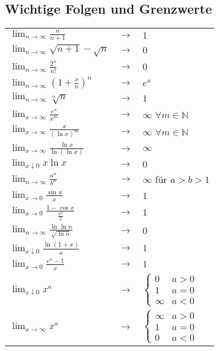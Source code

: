 \documentclass[a4paper,9pt]{extarticle}
\newcommand{\liminfty}[1][n]{\lim_{#1 \to \infty}}
\begin{document}
	\subsection*{Wichtige Folgen und Grenzwerte}
	\begin{tabular}{lcl}
		$ \liminfty{\frac{n}{n + 1}} $ & $\to$ & $1$ \\ [1ex]
		$ \liminfty{\sqrt{n + 1} - \sqrt{n}} $ & $\to$ & $0$ \\ [1ex]
		$ \liminfty{\frac{2^n}{n!}} $ & $\to$ & $0$ \\ [1ex]
		$ \liminfty{(1 + \frac{x}{n})^n} $ & $\to$ & $e^x$ \\ [1ex]
		$ \liminfty{\sqrt[n]{n}} $ & $\to$ & $1$ \\ [1ex]
		$ \liminfty[x]{\frac{e^x}{x^m}} $ & $\to$ & $∞$ $\forall m \in \mathbb{N}$ \\
		$ \liminfty[x]{\frac{x}{(\ln x)^m}} $ & $\to$ & $∞$ $\forall m \in \mathbb{N}$ \\
		$ \liminfty[x]{\frac{\ln x}{\ln (\ln x)}} $ & $\to$ & $∞$ \\
		$ \lim_{x ↓ 0} x \ln x$ & $\to$ & $0$ \\
		$ \liminfty{\frac{a^n}{b^n}} $ & $\to$ & $∞$ für $a > b > 1$\\
		$ \lim_{x → 0} {\frac{\sin x}{x}} $ & $\to$ & $1$\\
		$ \lim_{x → 0} {\frac{1 - \cos x}{\frac{x^2}{2}}} $ & $\to$ & $1$\\
		$ \liminfty {} \frac{\ln \ln n}{\sqrt{\ln n}} $ & $\to$ & $0$\\
		$ \lim_{x ↓ 0} \frac{\ln(1+x)}{x}$ & $\to$ & $1$ \\
		$ \lim_{x → 0} \frac{e^x-1}{x}$ & $\to$ & $1$ \\
		$ \lim_{x ↓ 0} x^a$ & $\to$ & $\begin{cases}
				0 & a > 0 \\
				1 & a = 0 \\
				∞ & a < 0
			\end{cases}$ \\
		$ \liminfty[x] x^a$ & $\to$ & $\begin{cases}
				∞ & a > 0 \\
				1 & a = 0 \\
				0 & a < 0
			\end{cases}$
		
	
		
	\end{tabular}
	\renewcommand{\arraystretch}{1}


\newpage
\end{document}
